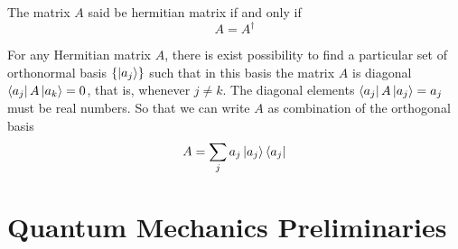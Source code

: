 \begin{defn}\label{DIA}

The matrix $A$ said be hermitian matrix if and only if $$A=A^\dagger$$
\end{defn}
\begin{prop}\label{prop1}
For any Hermitian matrix $A$, there is exist possibility to find a particular set of orthonormal basis $\{\ket{a_j}\}$ such that in this basis the matrix $A$ is diagonal $\bra{a_j}A\ket{a_k}=0$, that is,  whenever $j\neq k$. The diagonal elements $\bra{a_j}A\ket{a_j}=a_j$ must be real numbers.
So that we can write $A$ as combination of the orthogonal basis
$$A=\sum_j a_j \ket{a_j} \bra{a_j}$$
\end{prop}



\section{ Quantum Mechanics Preliminaries }
